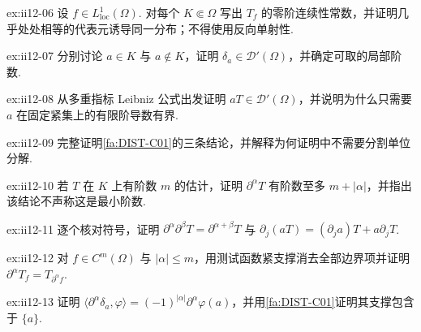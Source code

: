 \begin{FAExercise}[正则分布]{ex:ii12-06}
设 \(\displaystyle f\in L^1_{\mathrm{loc}}(\Omega)\). 对每个 \(\displaystyle K\Subset\Omega\) 写出 \(\displaystyle T_f\) 的零阶连续性常数，并证明几乎处处相等的代表元诱导同一分布；不得使用反向单射性.
\end{FAExercise}

\begin{FAExercise}{ex:ii12-07}
分别讨论 \(\displaystyle a\in K\) 与 \(\displaystyle a\notin K\)，证明 \(\displaystyle\delta_a\in\mathcal D'(\Omega)\)，并确定可取的局部阶数.
\end{FAExercise}

\begin{FAExercise}[光滑乘法]{ex:ii12-08}
从多重指标 Leibniz 公式出发证明 \(\displaystyle aT\in\mathcal D'(\Omega)\)，并说明为什么只需要 \(\displaystyle a\) 在固定紧集上的有限阶导数有界.
\end{FAExercise}

\begin{FAExercise}[支撑与局部性]{ex:ii12-09}
完整证明\autoref{fa:DIST-C01}的三条结论，并解释为何证明中不需要分割单位分解.
\end{FAExercise}

\begin{FAExercise}[分布导数与阶数]{ex:ii12-10}
若 \(\displaystyle T\) 在 \(\displaystyle K\) 上有阶数 \(\displaystyle m\) 的估计，证明 \(\displaystyle\partial^\alpha T\) 有阶数至多 \(\displaystyle m+|\alpha|\)，并指出该结论不声称这是最小阶数.
\end{FAExercise}

\begin{FAExercise}[混合导数与乘积法则]{ex:ii12-11}
逐个核对符号，证明 \(\displaystyle\partial^\alpha\partial^\beta T=\partial^{\alpha+\beta}T\) 与 \(\displaystyle\partial_j(aT)=(\partial_ja)T+a\partial_jT\).
\end{FAExercise}

\begin{FAExercise}[经典与分布意义的相容性]{ex:ii12-12}
对 \(\displaystyle f\in C^m(\Omega)\) 与 \(\displaystyle|\alpha|\leqslant m\)，用测试函数紧支撑消去全部边界项并证明 \(\displaystyle\partial^\alpha T_f=T_{\partial^\alpha f}\).
\end{FAExercise}

\begin{FAExercise}[Dirac 导数]{ex:ii12-13}
证明 \(\displaystyle\langle\partial^\alpha\delta_a,\varphi\rangle=(-1)^{|\alpha|}\partial^\alpha\varphi(a)\)，并用\autoref{fa:DIST-C01}证明其支撑包含于 \(\displaystyle\{a\}\).
\end{FAExercise}

